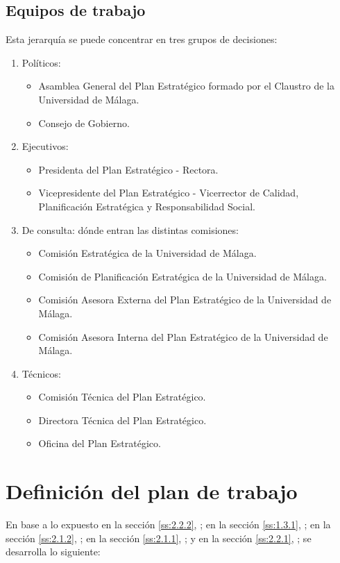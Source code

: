 \documentclass[11pt,a4paper,spanish,twoside]{report}
\begin{document}
\subsection{Equipos de trabajo} \label{ss:2.2.2}
Esta jerarquía se puede concentrar en tres grupos de decisiones:
\renewcommand{\labelenumi}{\alph{enumi}$)$ }
\begin{enumerate}
\item Políticos:
  \begin{itemize}
  \item Asamblea General del Plan Estratégico formado por el Claustro de la 
    Universidad de Málaga.
  \item Consejo de Gobierno.
  \end{itemize}
\item Ejecutivos:
  \begin{itemize}
  \item Presidenta del Plan Estratégico - Rectora.
  \item Vicepresidente del Plan Estratégico - Vicerrector de Calidad, 
    Planificación Estratégica y Responsabilidad Social. 
  \end{itemize}
\item De consulta: dónde entran las distintas comisiones:
  \begin{itemize}
  \item Comisión Estratégica de la Universidad de Málaga.
  \item Comisión de Planificación Estratégica de la Universidad de Málaga.
  \item Comisión Asesora Externa del Plan Estratégico de la Universidad de 
    Málaga.
  \item Comisión Asesora Interna del Plan Estratégico de la Universidad de 
    Málaga.
  \end{itemize}
\item Técnicos:
  \begin{itemize}
  \item Comisión Técnica del Plan Estratégico.
  \item Directora Técnica del Plan Estratégico.
  \item Oficina del Plan Estratégico.
  \end{itemize}
\end{enumerate}

\section{Definición del plan de trabajo}
En base a lo expuesto en la sección \vref{ss:2.2.2},
\emph{}; en la sección \vref{ss:1.3.1},
\emph{}; en la sección \vref{ss:2.1.2},
\emph{}; en la sección \vref{ss:2.1.1},
\emph{}; y en la sección \vref{ss:2.2.1},
\emph{}; se desarrolla lo siguiente:
\end{document}
